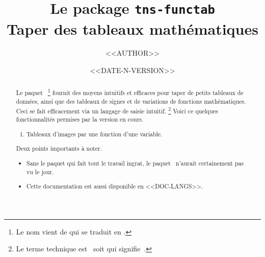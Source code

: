 \documentclass{tutodoc}
\begin{document}
\title{Le package \texttt{tns-functab} \\ Taper des tableaux mathématiques}
\author{<<AUTHOR>>}
\date{<<DATE-N-VERSION>>}

\maketitle

\begin{abstract}
    Le paquet \thisproj\,%
    \footnote{
        Le nom vient de  qui se traduit en .
    }
    fournit des moyens intuitifs et efficaces pour taper de petits tableaux de données, ainsi que des tableaux de signes et de variations de fonctions mathématiques. %
    Ceci se fait efficacement via un langage de saisie intuitif.%
    \footnote{
        Le terme technique est \dsl\ soit  qui signifie \,.
    }
    Voici ce quelques fonctionnalités
    permises par la version en cours.
    \begin{enumerate}
    	\item Tableaux d'images par une fonction d'une variable.
    
    \end{enumerate}
    
    \medskip
    
    \noindent
    Deux points importants à noter.
    \begin{itemize}
        \item Sans le paquet  qui fait tout le travail ingrat, le paquet \thisproj\ n'aurait certainement pas vu le jour.

        \item Cette documentation est aussi disponible en <<DOC-LANGS>>.
    \end{itemize}
\end{abstract}
    
\end{document}
